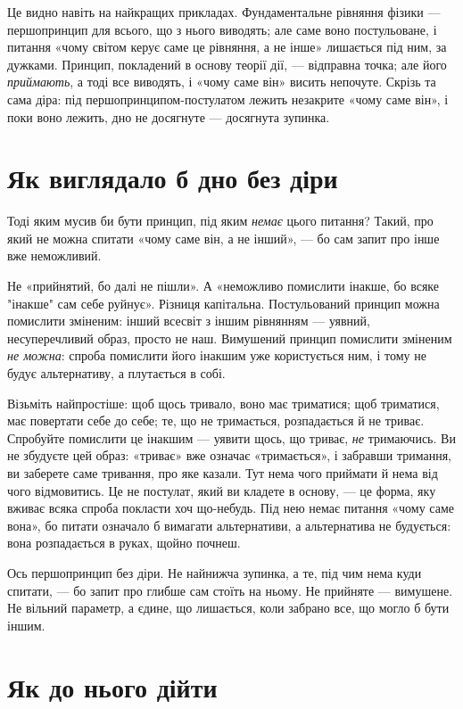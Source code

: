 \documentclass[12pt, a4paper, openany]{book}
\begin{document}
Це видно навіть на найкращих прикладах. Фундаментальне рівняння фізики --- першопринцип для всього, що з нього виводять; але саме воно постульоване, і питання «чому світом керує саме це рівняння, а не інше» лишається під ним, за дужками. Принцип, покладений в основу теорії дії, --- відправна точка; але його \emph{приймають}, а тоді все виводять, і «чому саме він» висить непочуте. Скрізь та сама діра: під першопринципом-постулатом лежить незакрите «чому саме він», і поки воно лежить, дно не досягнуте --- досягнута зупинка.

\section{Як виглядало б дно без діри}

Тоді яким мусив би бути принцип, під яким \emph{немає} цього питання? Такий, про який не можна спитати «чому саме він, а не інший», --- бо сам запит про інше вже неможливий.

Не «прийнятий, бо далі не пішли». А «неможливо помислити інакше, бо всяке "інакше" сам себе руйнує». Різниця капітальна. Постульований принцип можна помислити зміненим: інший всесвіт з іншим рівнянням --- уявний, несуперечливий образ, просто не наш. Вимушений принцип помислити зміненим \emph{не можна}: спроба помислити його інакшим уже користується ним, і тому не будує альтернативу, а плутається в собі.

Візьміть найпростіше: щоб щось тривало, воно має триматися; щоб триматися, має повертати себе до себе; те, що не тримається, розпадається й не триває. Спробуйте помислити це інакшим --- уявити щось, що триває, \emph{не} тримаючись. Ви не збудуєте цей образ: «триває» вже означає «тримається», і забравши тримання, ви заберете саме тривання, про яке казали. Тут нема чого приймати й нема від чого відмовитись. Це не постулат, який ви кладете в основу, --- це форма, яку вживає всяка спроба покласти хоч що-небудь. Під нею немає питання «чому саме вона», бо питати означало б вимагати альтернативи, а альтернатива не будується: вона розпадається в руках, щойно почнеш.

Ось першопринцип без діри. Не найнижча зупинка, а те, під чим нема куди спитати, --- бо запит про глибше сам стоїть на ньому. Не прийняте --- вимушене. Не вільний параметр, а єдине, що лишається, коли забрано все, що могло б бути іншим.

\section{Як до нього дійти}
\end{document}
